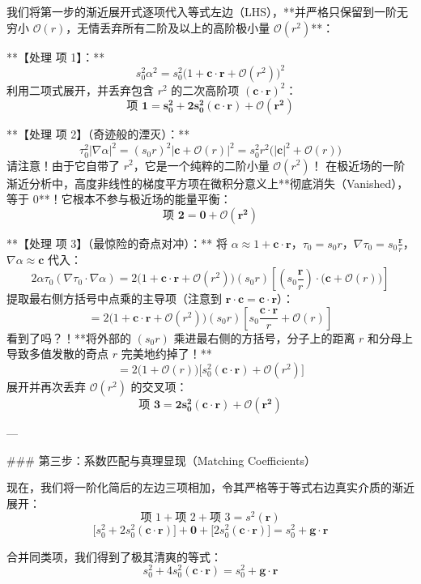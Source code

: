\documentclass[12pt]{article}
\begin{document}
{我们将第一步的渐近展开式逐项代入等式左边（LHS），**并严格只保留到一阶无穷小 $\mathcal{O}(r)$，无情丢弃所有二阶及以上的高阶极小量 $\mathcal{O}(r^2)$**：

**【处理 项 1】：**
$$ s_0^2 \alpha^2 = s_0^2 \big(1 + \mathbf{c} \cdot \mathbf{r} + \mathcal{O}(r^2)\big)^2 $$
利用二项式展开，并丢弃包含 $r^2$ 的二次高阶项 $(\mathbf{c} \cdot \mathbf{r})^2$：
$$ \mathbf{\text{项 1} = s_0^2 + 2 s_0^2 (\mathbf{c} \cdot \mathbf{r}) + \mathcal{O}(r^2)} $$

**【处理 项 2】（奇迹般的湮灭）：**
$$ \tau_0^2 |\nabla \alpha|^2 = (s_0 r)^2 |\mathbf{c} + \mathcal{O}(r)|^2 = s_0^2 r^2 \big( |\mathbf{c}|^2 + \mathcal{O}(r) \big) $$
请注意！由于它自带了 $r^2$，它是一个纯粹的二阶小量 $\mathcal{O}(r^2)$！
在极近场的一阶渐近分析中，高度非线性的梯度平方项在微积分意义上**彻底消失（Vanished），等于 0**！它根本不参与极近场的能量平衡：
$$ \mathbf{\text{项 2} = \mathbf{0} + \mathcal{O}(r^2)} $$

**【处理 项 3】（最惊险的奇点对冲）：**
将 $\alpha \approx 1 + \mathbf{c} \cdot \mathbf{r}$，$\tau_0 = s_0 r$，$\nabla \tau_0 = s_0 \frac{\mathbf{r}}{r}$，$\nabla \alpha \approx \mathbf{c}$ 代入：
$$ 2 \alpha \tau_0 (\nabla \tau_0 \cdot \nabla \alpha) = 2 \big(1 + \mathbf{c} \cdot \mathbf{r} + \mathcal{O}(r^2)\big) (s_0 r) \left[ \left( s_0 \frac{\mathbf{r}}{r} \right) \cdot \big(\mathbf{c} + \mathcal{O}(r)\big) \right] $$
提取最右侧方括号中点乘的主导项（注意到 $\mathbf{r} \cdot \mathbf{c} = \mathbf{c} \cdot \mathbf{r}$）：
$$ = 2 \big(1 + \mathbf{c} \cdot \mathbf{r} + \mathcal{O}(r^2)\big) (s_0 r) \left[ s_0 \frac{\mathbf{c} \cdot \mathbf{r}}{r} + \mathcal{O}(r) \right] $$
看到了吗？！**将外部的 $(s_0 r)$ 乘进最右侧的方括号，分子上的距离 $r$ 和分母上导致多值发散的奇点 $r$ 完美地约掉了！**
$$ = 2 \big(1 + \mathcal{O}(r)\big) \Big[ s_0^2 (\mathbf{c} \cdot \mathbf{r}) + \mathcal{O}(r^2) \Big] $$
展开并再次丢弃 $\mathcal{O}(r^2)$ 的交叉项：
$$ \mathbf{\text{项 3} = 2 s_0^2 (\mathbf{c} \cdot \mathbf{r}) + \mathcal{O}(r^2)} $$

---

### 第三步：系数匹配与真理显现（Matching Coefficients）

现在，我们将一阶化简后的左边三项相加，令其严格等于等式右边真实介质的渐近展开：
$$ \text{项 1} + \text{项 2} + \text{项 3} = s^2(\mathbf{r}) $$
$$ \Big[ s_0^2 + 2 s_0^2 (\mathbf{c} \cdot \mathbf{r}) \Big] + \mathbf{0} + \Big[ 2 s_0^2 (\mathbf{c} \cdot \mathbf{r}) \Big] = s_0^2 + \mathbf{g} \cdot \mathbf{r} $$

合并同类项，我们得到了极其清爽的等式：
$$ s_0^2 + 4 s_0^2 (\mathbf{c} \cdot \mathbf{r}) = s_0^2 + \mathbf{g} \cdot \mathbf{r} $$

}
\end{document}

